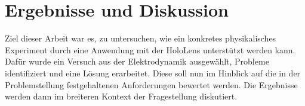 \section{Ergebnisse und Diskussion}
\label{sec-6}

Ziel dieser Arbeit war es, zu untersuchen, wie ein konkretes physikalisches Experiment durch eine Anwendung mit der HoloLens unterstützt werden kann. Dafür wurde ein Versuch aus der Elektrodynamik ausgewählt, Probleme identifiziert und eine Lösung erarbeitet. Diese soll nun im Hinblick auf die in der Problemstellung festgehaltenen Anforderungen bewertet werden. Die Ergebnisse werden dann im breiteren Kontext der Fragestellung diskutiert.

